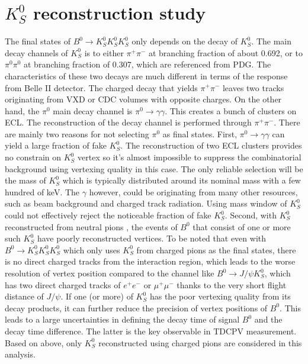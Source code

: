 \chapter{$K_S^0$ reconstruction study}

The final states of $B^0 \to K_S^0  K_S^0  K_S^0 $ only depends on the decay of $K_S^0$. The main decay channels of $K_S^0$ is to either $\pi^+ \pi^-$ at branching fraction of about 0.692, or to $\pi^0 \pi^0$ at branching fraction of 0.307, which are referenced from PDG\cite{pdg}.
 The characteristics of these two decays are much different in terms of the response from Belle II detector. The charged decay that yields  $\pi^+ \pi^-$ leaves two tracks originating from VXD or CDC volumes with opposite charges. On the other hand, the $\pi^0$ main decay channel is $\pi^0 \to \gamma \gamma$. This creates a bunch of clusters on ECL. The reconstruction of the decay channel is performed through  $\pi^+ \pi^-$. There are mainly two reasons for not selecting $\pi^0$ as final states.
 First, $\pi^0 \to \gamma \gamma$ can yield a large fraction of fake $K_S^0$. The reconstruction of two ECL clusters provides no constrain on $K_S^0$ vertex so it's almost impossible to suppress the combinatorial background using vertexing quality in this case. The only reliable selection will be the mass of $K_S^0$ which is typically distributed around its nominal mass with a few hundred of keV. 
 The $\gamma$ however, could be originating from many other resources, such as beam background and charged track radiation. Using mass window of $K_S^0$ could not effectively reject the noticeable fraction of fake $K_S^0$. Second, with $K_S^0$ reconstructed from neutral pions , the events of $B^0$ that consist of one or more such $K_S^0$ have poorly reconstructed vertices. To be noted that even with $B^0 \to K_S^0  K_S^0  K_S^0 $ which only uses $K_S^0$ from charged pions as the final states, there is no direct charged tracks from the interaction region, which leads to the worse resolution of vertex position compared to the channel like $B^0 \to J/\psi K_S^0$, which has two direct charged tracks of $e^+e^-$ or $\mu^+ \mu^-$ thanks to the very short flight distance of $J/\psi$. If one (or more) of $K^0_S$ has the poor vertexing quality from its decay products, it can further reduce the precision of vertex positions of $B^0$. This leads to a large uncertainties in defining the decay time of signal $B^0$ and the decay time difference. The latter is the key observable in TDCPV measurement. Based on above, only $K_S^0$ reconstructed using charged pions are considered in this analysis.
 
